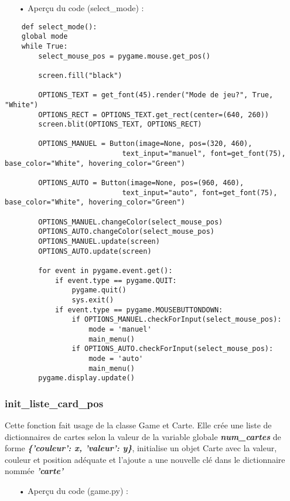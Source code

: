 	\begin{itemize}
	\color{blue}\item[•]Aperçu du code (select\_mode) :
	\end{itemize}
	\begin{lstlisting}
	def select_mode():
    global mode
    while True:
        select_mouse_pos = pygame.mouse.get_pos()

        screen.fill("black")

        OPTIONS_TEXT = get_font(45).render("Mode de jeu?", True, "White")
        OPTIONS_RECT = OPTIONS_TEXT.get_rect(center=(640, 260))
        screen.blit(OPTIONS_TEXT, OPTIONS_RECT)

        OPTIONS_MANUEL = Button(image=None, pos=(320, 460), 
                            text_input="manuel", font=get_font(75), base_color="White", hovering_color="Green")

        OPTIONS_AUTO = Button(image=None, pos=(960, 460), 
                            text_input="auto", font=get_font(75), base_color="White", hovering_color="Green")

        OPTIONS_MANUEL.changeColor(select_mouse_pos)
        OPTIONS_AUTO.changeColor(select_mouse_pos)
        OPTIONS_MANUEL.update(screen)
        OPTIONS_AUTO.update(screen)

        for event in pygame.event.get():
            if event.type == pygame.QUIT:
                pygame.quit()
                sys.exit()
            if event.type == pygame.MOUSEBUTTONDOWN:
                if OPTIONS_MANUEL.checkForInput(select_mouse_pos):
                    mode = 'manuel'
                    main_menu()
                if OPTIONS_AUTO.checkForInput(select_mouse_pos):
                    mode = 'auto'
                    main_menu()
        pygame.display.update()
	\end{lstlisting}
	
	\subsubsection{init\_liste\_card\_pos}
	Cette fonction fait usage de la classe Game et Carte. Elle crée une liste de dictionnaires de cartes selon la valeur de la variable globale \textbf{\emph{num\_cartes}} de forme \textbf{\emph{\{'couleur': x, 'valeur': y\}}}, initialise un objet Carte avec la valeur, couleur et position adéquate et l'ajoute a une nouvelle clé dans le dictionnaire nommée \textbf{\emph{'carte'}}
	\\
	\begin{itemize}
	\color{blue}\item[•]Aperçu du code (game.py) :
	\end{itemize}
	
